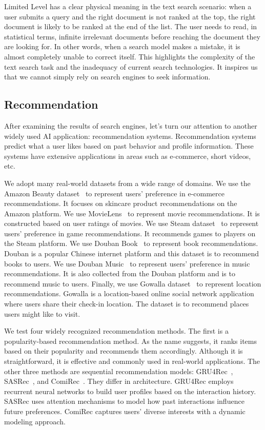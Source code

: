 Limited Level has a clear physical meaning in the text search scenario: when a user submits a query and the right document is not ranked at the top, the right document is likely to be ranked at the end of the list. The user needs to read, in statistical terms, infinite irrelevant documents before reaching the document they are looking for. In other words, when a search model makes a mistake, it is almost completely unable to correct itself.
This highlights the complexity of the text search task and the inadequacy of current search technologies. It inspires us that we cannot simply rely on search engines to seek information.

\subsection{Recommendation}



After examining the results of search engines, let’s turn our attention to another widely used AI application: recommendation systems. Recommendation systems predict what a user likes based on past behavior and profile information. These systems have extensive applications in areas such as e-commerce, short videos, etc. 

We adopt many real-world datasets from a wide range of domains. 
We use the Amazon Beauty dataset~\citep{he2016ups} to represent users' preference in e-commerce recommendations. It focuses on skincare product recommendations on the Amazon platform. 
We use MovieLens~\citep{harper2015movielens} to represent movie recommendations. It is constructed based on user ratings of movies. 
We use Steam dataset~\citep{kang2018self} to represent users' preference in game recommendations. It recommends games to players on the Steam platform.
We use Douban Book~\citep{zhu2020graphical, zhu2019dtcdr} to represent book recommendations. Douban is a popular Chinese internet platform and this dataset is to recommend books to users.
We use Douban Music~\citep{zhu2020graphical, zhu2019dtcdr} to represent users' preference in music recommendations. It is also collected from the Douban platform and is to recommend music to users.
Finally, we use Gowalla dataset~\citep{cho2011friendship} to represent location recommendations. Gowalla is a location-based online social network application where users share their check-in location. The dataset is to recommend places users might like to visit. 

We test four widely recognized recommendation methods. 
The first is a popularity-based recommendation method. As the name suggests, it ranks items based on their popularity and recommends them accordingly. Although it is straightforward, it is effective and commonly used in real-world applications. 
The other three methods are sequential recommendation models: GRU4Rec~\citep{hidasi2015session, hidasi2018recurrent}, SASRec~\citep{kang2018self}, and ComiRec~\citep{cen2020controllable}. They differ in architecture. GRU4Rec employs recurrent neural networks to build user profiles based on the interaction history. SASRec uses attention mechanisms to model how past interactions influence future preferences. ComiRec captures users’ diverse interests with a dynamic modeling approach.


